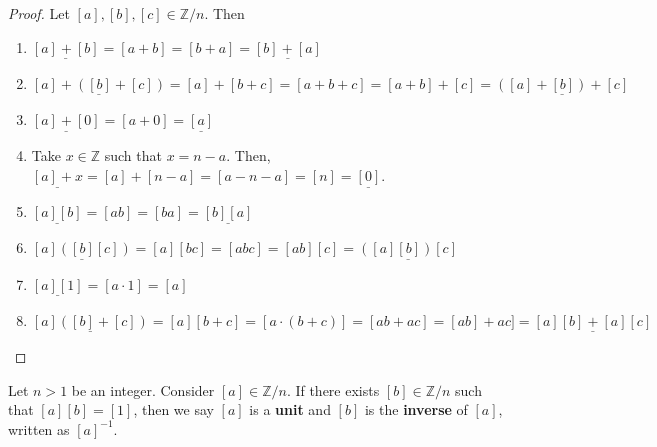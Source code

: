 \documentclass [12pt] {article}
\newcommand{\Z}{\mathbb{Z}}
\newenvironment{definition}[1]{\begin{tcolorbox}[title={Definition: #1},colback=blue!5!white,colframe=black!75!blue]}{\end{tcolorbox}}
\renewcommand{\bf}[1]{\textbf{{#1}}}
\newcommand{\ul}[1]{\underline{{#1}}}
\begin{document}
\begin{proof}
    Let $[a], [b], [c] \in \Z/n$. Then
    \begin{enumerate}[label=(\arabic*)]
        \item $\ul{[a] + [b]} = [a + b] = [b + a] = \ul{[b] + [a]}$
        \item $\ul{[a] + ([b] + [c])} = [a] + [b + c] = [a + b + c] = [a + b] + [c] = \ul{([a] + [b]) + [c]}$
        \item $\ul{[a] + [0]} = [a + 0] = \ul{[a]}$
        \item Take $x \in \Z$ such that $x = n - a$. Then, $\ul{[a] + x} = [a] + [n - a] = [a - n - a]  = [n] = \ul{[0]}$.
        \item $\ul{[a][b]} = [ab] = [ba] = \ul{[b][a]}$
        \item $\ul{[a] ([b][c])} = [a][bc] = [abc] = [ab][c] = \ul{([a][b]) [c]}$
        \item $\ul{[a][1]} = [a \cdot 1] = [a]$
        \item $\ul{[a] ([b] + [c])} = [a][b + c] = [a \cdot (b + c)] = [ab + ac] = [ab] + ac] = \ul{[a][b] + [a][c]}$
    \end{enumerate}
\end{proof}

\begin{definition}{Unit and Inverse}
    Let $n > 1$ be an integer. Consider $[a] \in \Z/n$. If there exists $[b] \in \Z/n$ such that
    $[a][b] = [1]$, then we say $[a]$ is a \bf{unit} and $[b]$ is the \bf{inverse} of $[a]$, written
    as $[a]^{-1}$.
\end{definition}
\end{document}
